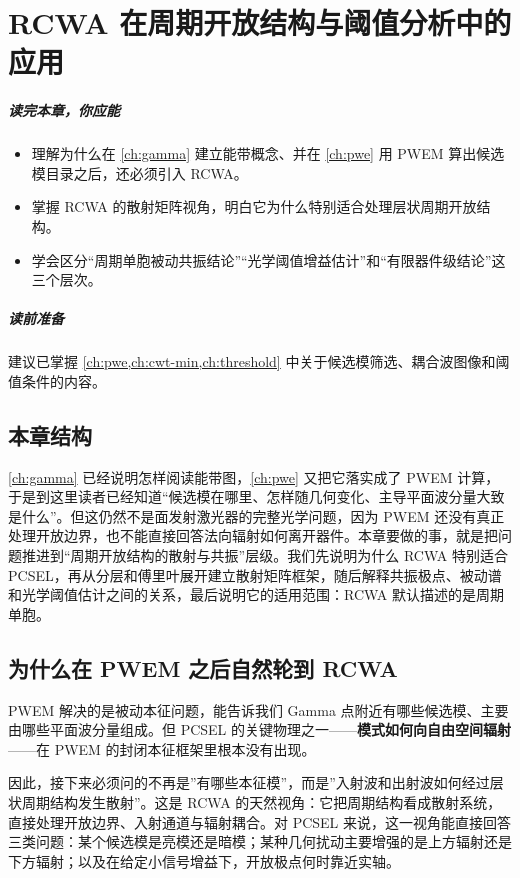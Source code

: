 \chapter{RCWA 在周期开放结构与阈值分析中的应用}
\label{ch:rcwa}

\paragraph{读完本章，你应能}
\begin{itemize}
  \item 理解为什么在 \cref{ch:gamma} 建立能带概念、并在 \cref{ch:pwe} 用 PWEM 算出候选模目录之后，还必须引入 RCWA。
  \item 掌握 RCWA 的散射矩阵视角，明白它为什么特别适合处理层状周期开放结构。
  \item 学会区分“周期单胞被动共振结论”“光学阈值增益估计”和“有限器件级结论”这三个层次。
\end{itemize}

\paragraph{读前准备}
建议已掌握 \cref{ch:pwe,ch:cwt-min,ch:threshold} 中关于候选模筛选、耦合波图像和阈值条件的内容。

\section*{本章结构}
\cref{ch:gamma} 已经说明怎样阅读能带图，\cref{ch:pwe} 又把它落实成了 PWEM 计算，于是到这里读者已经知道“候选模在哪里、怎样随几何变化、主导平面波分量大致是什么”。但这仍然不是面发射激光器的完整光学问题，因为 PWEM 还没有真正处理开放边界，也不能直接回答法向辐射如何离开器件。本章要做的事，就是把问题推进到“周期开放结构的散射与共振”层级。我们先说明为什么 RCWA 特别适合 PCSEL，再从分层和傅里叶展开建立散射矩阵框架，随后解释共振极点、被动谱和光学阈值估计之间的关系，最后说明它的适用范围：RCWA 默认描述的是周期单胞。

\section{为什么在 PWEM 之后自然轮到 RCWA}
PWEM 解决的是被动本征问题，能告诉我们 Gamma 点附近有哪些候选模、主要由哪些平面波分量组成。但 PCSEL 的关键物理之一——\textbf{模式如何向自由空间辐射}——在 PWEM 的封闭本征框架里根本没有出现。

因此，接下来必须问的不再是”有哪些本征模”，而是”入射波和出射波如何经过层状周期结构发生散射”。这是 RCWA 的天然视角：它把周期结构看成散射系统，直接处理开放边界、入射通道与辐射耦合。对 PCSEL 来说，这一视角能直接回答三类问题：某个候选模是亮模还是暗模；某种几何扰动主要增强的是上方辐射还是下方辐射；以及在给定小信号增益下，开放极点何时靠近实轴。

